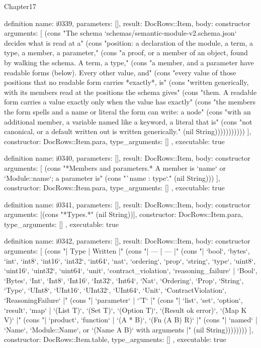 \begin{lexlean}{Chapter17}
\begin{semanticmodule}
definition{
  name: i0339,
  parameters: [],
  result: DocRows::Item,
  body: constructor{
    arguments: [
      (cons "The schema `schemas/semantic-module-v2.schema.json` decides what is read at a" (cons "position: a declaration of the module, a term, a type, a member, a parameter," (cons "a proof, or a member of an object, found by walking the schema. A term, a type," (cons "a member, and a parameter have readable forms (below). Every other value, and" (cons "every value of those positions that no readable form carries *exactly*, is" (cons "written generically, with its members read at the positions the schema gives" (cons "them. A readable form carries a value exactly only when the value has exactly" (cons "the members the form spells and a name or literal the form can write: a node" (cons "with an additional member, a variable named like a keyword, a literal that is" (cons "not canonical, or a default written out is written generically." (nil String)))))))))))
    ],
    constructor: DocRows::Item.para,
    type_arguments: []
  },
  executable: true
}

definition{
  name: i0340,
  parameters: [],
  result: DocRows::Item,
  body: constructor{
    arguments: [
      (cons "*Members and parameters.* A member is `name` or `Module::name`; a parameter is" (cons "`name : type`." (nil String)))
    ],
    constructor: DocRows::Item.para,
    type_arguments: []
  },
  executable: true
}

definition{
  name: i0341,
  parameters: [],
  result: DocRows::Item,
  body: constructor{
    arguments: [(cons "*Types.*" (nil String))],
    constructor: DocRows::Item.para,
    type_arguments: []
  },
  executable: true
}

definition{
  name: i0342,
  parameters: [],
  result: DocRows::Item,
  body: constructor{
    arguments: [
      (cons "| Type | Written |" (cons "| --- | --- |" (cons "| `bool`, `bytes`, `int`, `int8`, `int16`, `int32`, `int64`, `nat`, `ordering`, `prop`, `string`, `type`, `uint8`, `uint16`, `uint32`, `uint64`, `unit`, `contract_violation`, `reasoning_failure` | `Bool`, `Bytes`, `Int`, `Int8`, `Int16`, `Int32`, `Int64`, `Nat`, `Ordering`, `Prop`, `String`, `Type`, `UInt8`, `UInt16`, `UInt32`, `UInt64`, `Unit`, `ContractViolation`, `ReasoningFailure` |" (cons "| `parameter` | `'T` |" (cons "| `list`, `set`, `option`, `result`, `map` | `(List T)`, `(Set T)`, `(Option T)`, `(Result ok error)`, `(Map K V)` |" (cons "| `product`, `function` | `(A * B)`, `(Fn (A B) R)` |" (cons "| `named` | `Name`, `Module::Name`, or `(Name A B)` with arguments |" (nil String))))))))
    ],
    constructor: DocRows::Item.table,
    type_arguments: []
  },
  executable: true
}


\end{semanticmodule}
\end{lexlean}
